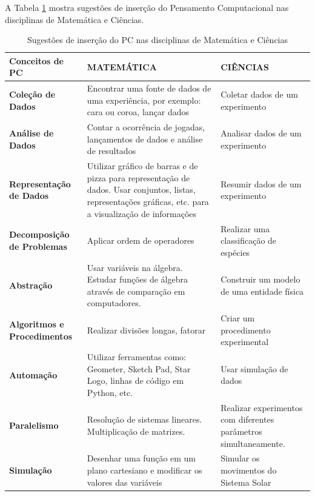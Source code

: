 \documentclass[12pt, openright, a4paper, brazil, english, french, spanish, bibjustif, openany, oneside]{abntex2}
\begin{document}
A Tabela \ref{tab1} mostra sugestões de inserção do Pensamento Computacional nas disciplinas de Matemática e Ciências.

\newpage

\begin{table}[ht]
        \centering
        \caption{Sugestões de inserção do PC nas disciplinas de Matemática e Ciências \label{tab1}}
                
        \begin{tabular}{ >{\centering\arraybackslash}m{3cm} >{\centering\arraybackslash}m{5.5cm} >{\centering\arraybackslash}m{6cm}}
            \toprule
            \textbf{Conceitos de PC} & \textbf{MATEMÁTICA} & \textbf{CIÊNCIAS} \\
            \midrule
            \textbf{Coleção de Dados} & Encontrar uma fonte de dados de uma experiência, por exemplo: cara ou coroa, lançar dados & Coletar dados de um experimento \\
            \midrule
            \textbf{Análise de Dados} & Contar a ocorrência de jogadas, lançamentos de dados e análise de resultados & Analisar dados de um experimento  \\
            \midrule
            \textbf{Representação de Dados} & Utilizar gráfico de barras e de pizza para representação de dados. Usar conjuntos, listas, representações gráficas, etc. para a visualização de informações & Resumir dados de um experimento \\
            \midrule
            \textbf{Decomposição de Problemas} & Aplicar ordem de operadores & Realizar uma classificação de espécies \\
            \midrule
            \textbf{Abstração} & Usar variáveis na álgebra. Estudar funções de álgebra através de comparação em computadores. & Construir um modelo de uma entidade física \\
            \midrule
            \textbf{Algoritmos e Procedimentos} & Realizar divisões longas, fatorar & Criar um procedimento experimental \\
            \midrule
            \textbf{Automação} & Utilizar ferramentas como: Geometer, Sketch Pad, Star Logo, linhas de código em Python, etc. & Usar simulação de dados \\
            \midrule
            \textbf{Paralelismo} & Resolução de sistemas lineares. Multiplicação de matrizes. & Realizar experimentos com diferentes parâmetros simultaneamente. \\
            \midrule
            \textbf{Simulação} & Desenhar uma função em um plano cartesiano e modificar os valores das variáveis & Simular os movimentos do Sistema Solar \\
            \bottomrule
        \end{tabular}
    \end{table}
\end{document}
